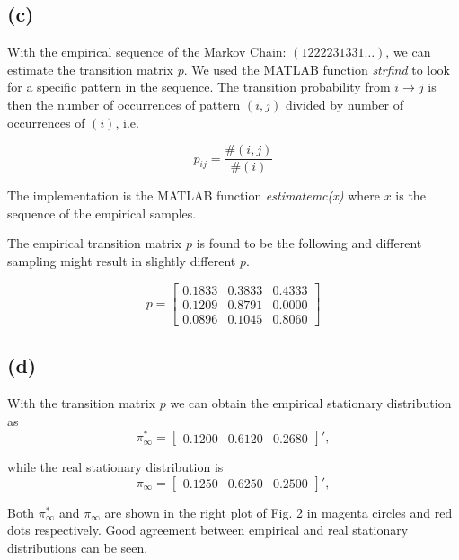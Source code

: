 \documentclass[a4paper, 11pt]{article}
\begin{document}
\subsection*{(c)}

With the empirical sequence of the Markov Chain: $(1222231331 \dots)$, we can estimate the transition matrix $p$. We used the MATLAB function \textit{strfind} to look for a specific pattern in the sequence. The transition probability from $i \to j$ is then the number of occurrences of pattern $(i, j)$ divided by number of occurrences of $(i)$, i.e.

\begin{equation}
p_{ij} = \frac{\#(i, j)}{\#(i)}
\end{equation}

The implementation is the MATLAB function \textit{estimatemc(x)} where $x$ is the sequence of the empirical samples.

The empirical transition matrix $p$ is found to be the following and different sampling might result in slightly different $p$. 

\begin{equation}
p = \begin{bmatrix}
0.1833 & 0.3833 & 0.4333 \\
0.1209 & 0.8791 & 0.0000 \\
0.0896 & 0.1045 & 0.8060
\end{bmatrix}
\end{equation}

\subsection*{(d)}

With the transition matrix $p$ we can obtain the empirical stationary distribution as 
\begin{equation}
\pi^*_\infty = \begin{bmatrix}
0.1200 & 0.6120 &0.2680
\end{bmatrix}',
\end{equation}

while the real stationary distribution is 
\begin{equation}
\pi_\infty = \begin{bmatrix}
0.1250 & 0.6250 &0.2500
\end{bmatrix}',
\end{equation}

Both $\pi^*_\infty$ and $\pi_\infty$ are shown in the right plot of Fig. 2 in magenta circles and red dots respectively. Good agreement between empirical and real stationary distributions can be seen. 
\end{document}
